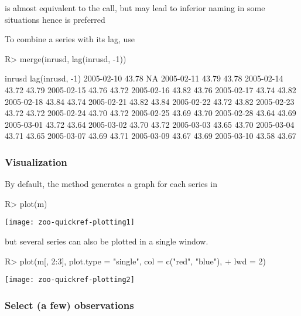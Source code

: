 \documentclass[article,nojss]{jss}
\newcommand{\mysection}[1]{\subsubsection[#1]{\textbf{#1}}}
\begin{document}
 is almost equivalent to the 
call, but may lead to inferior naming in some situations 
hence  is preferred

To combine a series with its lag, use
\begin{Schunk}
\begin{Sinput}
R> merge(inrusd, lag(inrusd, -1))
\end{Sinput}
\begin{Soutput}
           inrusd lag(inrusd, -1)
2005-02-10  43.78              NA
2005-02-11  43.79           43.78
2005-02-14  43.72           43.79
2005-02-15  43.76           43.72
2005-02-16  43.82           43.76
2005-02-17  43.74           43.82
2005-02-18  43.84           43.74
2005-02-21  43.82           43.84
2005-02-22  43.72           43.82
2005-02-23  43.72           43.72
2005-02-24  43.70           43.72
2005-02-25  43.69           43.70
2005-02-28  43.64           43.69
2005-03-01  43.72           43.64
2005-03-02  43.70           43.72
2005-03-03  43.65           43.70
2005-03-04  43.71           43.65
2005-03-07  43.69           43.71
2005-03-09  43.67           43.69
2005-03-10  43.58           43.67
\end{Soutput}
\end{Schunk}

\mysection{Visualization}

By default, the  method generates a graph for each
series in 
\begin{center}
\begin{Schunk}
\begin{Sinput}
R> plot(m)
\end{Sinput}
\end{Schunk}
\texttt{[image: zoo-quickref-plotting1]}
\end{center}

but several series can also be plotted in a single window.
\begin{center}
\begin{Schunk}
\begin{Sinput}
R> plot(m[, 2:3], plot.type = "single", col = c("red", "blue"), 
+     lwd = 2)
\end{Sinput}
\end{Schunk}
\texttt{[image: zoo-quickref-plotting2]}
\end{center}

\mysection{Select (a few) observations}
\end{document}
